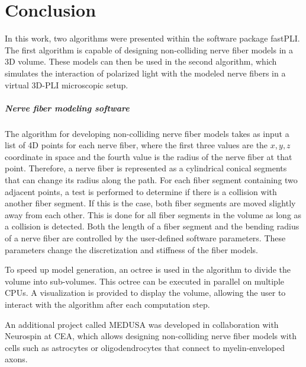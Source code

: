 \cleardoublepage
\setcounter{chapter}{10}
\chapter{Conclusion}
\label{sec:conclusion}
% 
In this work, two algorithms were presented within the software package \ac{fastPLI}.
The first algorithm is capable of designing non-colliding nerve fiber models in a 3D volume.
These models can then be used in the second algorithm, which simulates the interaction of polarized light with the modeled nerve fibers in a virtual \ac{3D-PLI} microscopic setup.
% 
% 
% 
\paragraph{Nerve fiber modeling software}
% 
The algorithm for developing non-colliding nerve fiber models takes as input a list of 4D points for each nerve fiber, where the first three values are the $x,y,z$ coordinate in space and the fourth value is the radius of the nerve fiber at that point.
Therefore, a nerve fiber is represented as a cylindrical conical segments that can change its radius along the path.
For each fiber segment containing two adjacent points, a test is performed to determine if there is a collision with another fiber segment.
If this is the case, both fiber segments are moved slightly away from each other.
This is done for all fiber segments in the volume as long as a collision is detected.
Both the length of a fiber segment and the bending radius of a nerve fiber are controlled by the user-defined software parameters.
These parameters change the discretization and stiffness of the fiber models.
\par
% 
To speed up model generation, an octree is used in the algorithm to divide the volume into sub-volumes.
This octree can be executed in parallel on multiple \acp{CPU}.
A visualization is provided to display the volume, allowing the user to interact with the algorithm after each computation step.
\par
% 
An additional project called \ac{MEDUSA} was developed in collaboration with Neurospin at \ac{CEA}, which allows designing non-colliding nerve fiber models with cells such as astrocytes or oligodendrocytes that connect to myelin-enveloped axons.
% 
% 
% 
